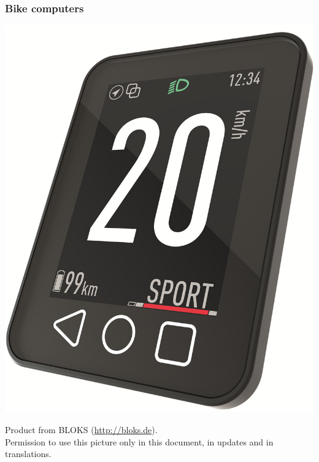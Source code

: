 \begin{frame}
\frametitle{Bike computers}
  \begin{center}
    \includegraphics[height=0.8\textheight]{slides/sysdev-intro/bike-computer.jpg}
  \end{center}
  \tiny
  Product from BLOKS (\url{http://bloks.de}).\\
  Permission to use this picture only in this document, in updates and
  in translations.
\end{frame}

